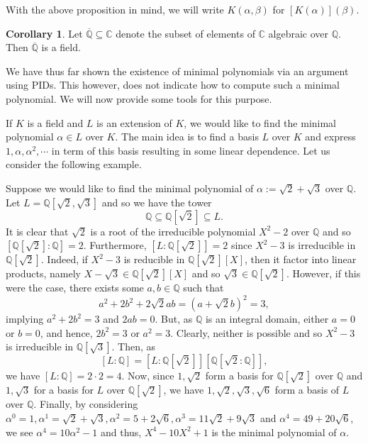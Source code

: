 \documentclass[]{article}
\theoremstyle{definition}
\newtheorem{corollary}{Corollary}[theorem]
\theoremstyle{definition}
\begin{document}
With the above proposition in mind, we will write \(K(\alpha, \beta)\) for 
\([K(\alpha)](\beta)\).

\begin{corollary}
  Let \(\overline{\mathbb{Q}} \subseteq \mathbb{C}\) denote the subset of elements of 
  \(\mathbb{C}\) algebraic over \(\mathbb{Q}\). Then \(\overline{\mathbb{Q}}\) is 
  a field.
\end{corollary}

We have thus far shown the existence of minimal polynomials via an argument 
using PIDs. This however, does not indicate how to compute such a minimal 
polynomial. We will now provide some tools for this purpose.

If \(K\) is a field and \(L\) is an extension of \(K\), we would like to find 
the minimal polynomial \(\alpha \in L\) over \(K\). The main idea is to find 
a basis \(L\) over \(K\) and express \(1, \alpha, \alpha^2, \cdots\) in term of 
this basis resulting in some linear dependence. Let us consider the following 
example. 

Suppose we would like to find the minimal polynomial of 
\(\alpha := \sqrt{2} + \sqrt{3}\)
over \(\mathbb{Q}\). Let \(L = \mathbb{Q}[\sqrt{2}, \sqrt{3}]\) and so we have 
the tower 
\[\mathbb{Q} \subseteq \mathbb{Q}[\sqrt{2}] \subseteq L.\]
It is clear that \(\sqrt{2}\) is a root of the irreducible polynomial 
\(X^2 - 2\) over \(\mathbb{Q}\) and so \([\mathbb{Q}[\sqrt{2}] : \mathbb{Q}] = 2\).
Furthermore, \([L : \mathbb{Q}[\sqrt{2}]] = 2\) since \(X^2 - 3\) is irreducible 
in \(\mathbb{Q}[\sqrt{2}]\). Indeed, if \(X^2 - 3\) is reducible in 
\(\mathbb{Q}[\sqrt{2}][X]\), then it factor into linear products, namely 
\(X - \sqrt{3} \in \mathbb{Q}[\sqrt{2}][X]\) and so 
\(\sqrt{3} \in \mathbb{Q}[\sqrt{2}]\). However, if this were the case, there 
exists some \(a, b \in \mathbb{Q}\) such that 
\[a^2 + 2b^2 + 2\sqrt{2}ab = (a + \sqrt{2}b)^2 = 3,\]
implying \(a^2 + 2b^2 = 3\) and \(2ab = 0\). But, as \(\mathbb{Q}\) 
is an integral domain, either \(a = 0\) or \(b = 0\), and hence, 
\(2b^2 = 3\) or \(a^2 = 3\). Clearly, neither is possible and so \(X^2 - 3\) 
is irreducible in \(\mathbb{Q}[\sqrt{3}]\). Then, as 
\[[L : \mathbb{Q}] = [L : \mathbb{Q}[\sqrt{2}]][\mathbb{Q}[\sqrt{2} : \mathbb{Q}]],\]
we have \([L : \mathbb{Q}] = 2 \cdot 2 = 4\). Now, since \(1, \sqrt{2}\)
form a basis for \(\mathbb{Q}[\sqrt{2}]\) over \(\mathbb{Q}\) and 
\(1, \sqrt{3}\) for a basis for \(L\) over \(\mathbb{Q}[\sqrt{2}]\), we have 
\(1, \sqrt{2}, \sqrt{3}, \sqrt{6}\) form a basis of \(L\) over \(\mathbb{Q}\).
Finally, by considering \(\alpha^0 = 1, \alpha^1 = \sqrt{2} + \sqrt{3}, 
\alpha^2 = 5 + 2\sqrt{6}, \alpha^3 = 11\sqrt{2} +9\sqrt{3}\) and 
\(\alpha^4 = 49 + 20\sqrt{6}\), we see \(\alpha^4 = 10\alpha^2 - 1\) and thus, 
\(X^4 - 10X^2 + 1\) is the minimal polynomial of \(\alpha\).
\end{document}
